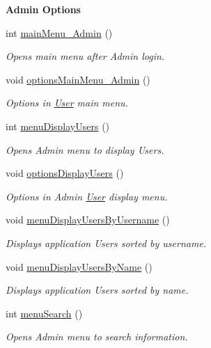 \begin{Indent}\textbf{ Admin Options}\par
\begin{DoxyCompactItemize}
\item 
int \hyperlink{group___agency_ga1c4e64231b979f1a1bc4881ebf3e3aed}{main\+Menu\+\_\+\+Admin} ()
\begin{DoxyCompactList}\small\item\em Opens main menu after Admin login. \end{DoxyCompactList}\item 
void \hyperlink{group___agency_ga624b23c124d1002f6937b2a006c46834}{options\+Main\+Menu\+\_\+\+Admin} ()
\begin{DoxyCompactList}\small\item\em Options in \hyperlink{class_user}{User} main menu. \end{DoxyCompactList}\item 
int \hyperlink{group___agency_gabe52082b4fcaed078b3505f627e6bbbf}{menu\+Display\+Users} ()
\begin{DoxyCompactList}\small\item\em Opens Admin menu to display Users. \end{DoxyCompactList}\item 
void \hyperlink{group___agency_gacea7e0ae6d04651406786f966cf10cab}{options\+Display\+Users} ()
\begin{DoxyCompactList}\small\item\em Options in Admin \hyperlink{class_user}{User} display menu. \end{DoxyCompactList}\item 
void \hyperlink{group___agency_gad1043b390ee14a047d4f8a65a0a87851}{menu\+Display\+Users\+By\+Username} ()
\begin{DoxyCompactList}\small\item\em Displays application Users sorted by username. \end{DoxyCompactList}\item 
void \hyperlink{group___agency_ga6d95d9219a22e771f77306eca2970f7f}{menu\+Display\+Users\+By\+Name} ()
\begin{DoxyCompactList}\small\item\em Displays application Users sorted by name. \end{DoxyCompactList}\item 
int \hyperlink{group___agency_gacdf25fd2da688fccf730ffb5d63f8ea2}{menu\+Search} ()
\begin{DoxyCompactList}\small\item\em Opens Admin menu to search information. \end{DoxyCompactList}\item 

\end{DoxyCompactItemize}
\end{Indent}

